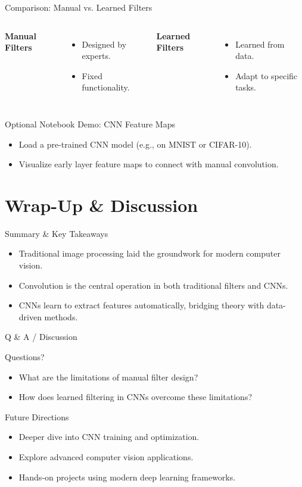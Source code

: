 \documentclass{beamer}
\begin{document}
\begin{frame}{Comparison: Manual vs. Learned Filters}
  \begin{columns}
      \textbf{Manual Filters}
      \begin{itemize}
        \item Designed by experts.
        \item Fixed functionality.
      \end{itemize}
      \textbf{Learned Filters}
      \begin{itemize}
        \item Learned from data.
        \item Adapt to specific tasks.
      \end{itemize}
  \end{columns}
\end{frame}

\begin{frame}{Optional Notebook Demo: CNN Feature Maps}
  \begin{itemize}
    \item Load a pre-trained CNN model (e.g., on MNIST or CIFAR-10).
    \item Visualize early layer feature maps to connect with manual convolution.
  \end{itemize}
\end{frame}

\section{Wrap-Up \& Discussion}

\begin{frame}{Summary \& Key Takeaways}
  \begin{itemize}
    \item Traditional image processing laid the groundwork for modern computer vision.
    \item Convolution is the central operation in both traditional filters and CNNs.
    \item CNNs learn to extract features automatically, bridging theory with data-driven methods.
  \end{itemize}
\end{frame}

\begin{frame}{Q \& A / Discussion}
  \begin{center}
    \Huge Questions?
  \end{center}
  \begin{itemize}
    \item What are the limitations of manual filter design?
    \item How does learned filtering in CNNs overcome these limitations?
  \end{itemize}
\end{frame}

\begin{frame}{Future Directions}
  \begin{itemize}
    \item Deeper dive into CNN training and optimization.
    \item Explore advanced computer vision applications.
    \item Hands-on projects using modern deep learning frameworks.
  \end{itemize}
\end{frame}
\end{document}
